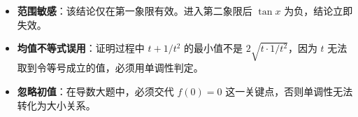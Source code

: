 \begin{trapbox}
\begin{itemize}
    \item \textbf{范围敏感}：该结论仅在第一象限有效。进入第二象限后 $\tan x$ 为负，结论立即失效。
    \item \textbf{均值不等式误用}：证明过程中 $t + 1/t^2$ 的最小值不是 $2\sqrt{t \cdot 1/t^2}$，因为 $t$ 无法取到令等号成立的值，必须用单调性判定。
    \item \textbf{忽略初值}：在导数大题中，必须交代 $f(0)=0$ 这一关键点，否则单调性无法转化为大小关系。
\end{itemize}
\end{trapbox}